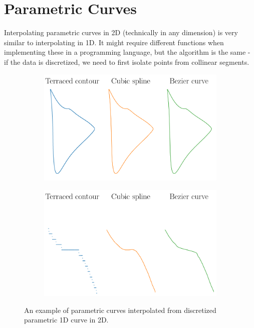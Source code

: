 \documentclass[a4paper,10pt]{report}
\begin{document}
\section{Parametric Curves}
Interpolating parametric curves in 2D (technically in any dimension) is very similar to interpolating in 1D. It might require different functions when implementing these in a programming language, but the algorithm is the same - if the data is discretized, we need to first isolate points from collinear segments.
\begin{figure}[H]
    \centering
    \begin{subfigure}{0.49\textwidth}
        \includegraphics[width=\textwidth]{../images/2D_Contour.png}
    \end{subfigure}
    \hfill
    \begin{subfigure}{0.49\textwidth}
        \includegraphics[width=\textwidth]{../images/2D_Contour_Zoomed.png}
    \end{subfigure}
    \caption{An example of parametric curves interpolated from discretized parametric 1D curve in 2D.}
    \label{fig:2D_parametric_curve}
\end{figure}
\end{document}
